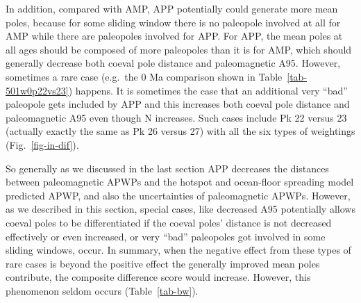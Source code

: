 In addition, compared with AMP, APP potentially could generate more mean poles,
because for some sliding window there is no paleopole involved at all for AMP\@
while there are paleopoles involved for APP\@. For APP, the mean poles at all
ages should be composed of more paleopoles than it is for AMP, which should
generally decrease both coeval pole distance and paleomagnetic A95. However,
sometimes a rare case (e.g.\ the 0 Ma comparison shown in
Table~\ref{tab-501w0p22vs23}) happens. It is sometimes the case that an
additional very ``bad'' paleopole gets included by APP and this increases both
coeval pole distance and paleomagnetic A95 even though N increases. Such cases
include Pk 22 versus 23 (actually exactly the same as Pk 26 versus
27) with all the six types of weightings (Fig.~\ref{fig-in-dif}).

So generally as we discussed in the last section APP decreases the distances
between paleomagnetic APWPs and the hotspot and ocean-floor spreading model
predicted APWP, and also the uncertainties of paleomagnetic APWPs. However, as
we described in this section, special cases, like decreased A95 potentially
allows coeval poles to be differentiated if the coeval poles' distance is not
decreased effectively or even increased, or very ``bad'' paleopoles got involved
in some sliding windows, occur. In summary, when the negative effect from these
types of rare cases is beyond the positive effect the generally improved mean
poles contribute, the composite difference score would increase. However, this
phenomenon seldom occurs (Table~\ref{tab-bw}).

